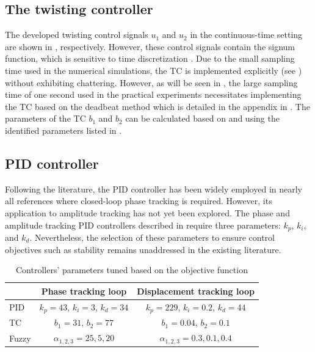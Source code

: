 \documentclass[lettersize,journal]{IEEEtran}
\begin{document}
\subsection{The twisting controller} \label{S_designed_TC}

The developed twisting control signals $u_1$ and $u_2$ in the continuous-time setting are shown in , respectively. However, these control signals contain the signum function, which is sensitive to time discretization \cite{MOJALLIZADEH_Franklin}. Due to the small sampling time used in the numerical simulations, the TC is implemented explicitly (see ) without exhibiting chattering. However, as will be seen in , the large sampling time of one second used in the practical experiments necessitates implementing the TC based on the deadbeat method which is detailed in the appendix in . The parameters of the TC $b_1$ and $b_2$ can be calculated based on  and using the identified parameters listed in .

\subsection{PID controller} \label{S_designed_PI}

Following the literature, the PID controller has been widely employed in nearly all references where closed-loop phase tracking is required. However, its application to amplitude tracking has not yet been explored. The phase and amplitude tracking PID controllers described in  require three parameters: $k_p$, $k_i$, and $k_d$. Nevertheless, the selection of these parameters to ensure control objectives such as stability remains unaddressed in the existing literature.

\begin{table}
    \centering
    \begin{tabular}{|l|c|c|} \hline 
\cellcolor{gray}  & Phase tracking loop  & Displacement tracking loop \\ \hline
PID & $k_p=43$,  $k_i=3$, $k_d=34$  & $k_p=229$,  $k_i=0.2$, $k_d=44$ \\ \hline
TC & $b_1=31$,  $b_2=77$  & $b_1=0.04$,  $b_2=0.1$ \\ \hline
Fuzzy & $\alpha_{1,2,3}=25, 5, 20$  & $\alpha_{1,2,3}=0.3, 0.1, 0.4$  \\  \hline
    \end{tabular}
    \vspace{0.1cm}
    \caption{Controllers' parameters tuned based on the objective function }
    \label{T_parameters}
\end{table}
\end{document}
